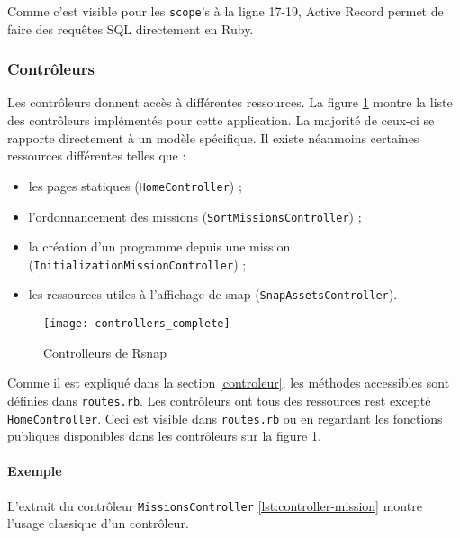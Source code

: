 Comme c'est visible pour les \lstinline[language=Rails]{scope}'s à la ligne 17-19, Active Record permet de faire des requêtes SQL directement en Ruby.
\begin{figure}

\end{figure}

\subsubsection{Contrôleurs}
Les contrôleurs donnent accès à différentes ressources. La figure \ref{fig:controllers} montre la liste des contrôleurs implémentés pour cette application. La majorité de ceux-ci se rapporte directement à un modèle spécifique. Il existe néanmoins certaines ressources différentes telles que :
\begin{itemize}
  \item les pages statiques (\texttt{HomeController}) ;
  \item l'ordonnancement des \glspl{mission} (\texttt{SortMissionsController}) ;
  \item la création d'un programme depuis une \gls{mission} (\texttt{InitializationMissionController}) ;
  \item les ressources utiles à l'affichage de \gls{snap} (\texttt{SnapAssetsController}).
\end{itemize}

\begin{figure}
 \begin{center}
   \texttt{[image: controllers\_complete]}
   \caption{Controlleurs de Rsnap}
   \label{fig:controllers}
 \end{center}
\end{figure}

Comme il est expliqué dans la section \ref{controleur}, les méthodes accessibles sont définies dans \texttt{routes.rb}. Les contrôleurs ont tous des ressources \gls{rest} excepté \texttt{HomeController}. Ceci est visible dans \texttt{routes.rb} ou en regardant les fonctions publiques disponibles dans les contrôleurs sur la figure \ref{fig:controllers}.

\paragraph{Exemple}
L'extrait du contrôleur \texttt{MissionsController} \ref{lst:controller-mission} montre l'usage classique d'un contrôleur.

